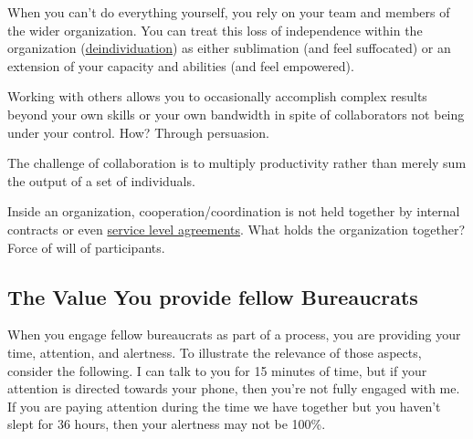 When you can't do everything yourself, you rely on your team and members of the wider organization. You can treat this loss of independence within the organization (\href{https://en.wikipedia.org/wiki/Deindividuation}{deindividuation}) 
as either sublimation (and feel suffocated) or an extension of your capacity and abilities (and feel empowered).



Working with others allows you to occasionally accomplish complex results beyond your own skills or your own bandwidth in spite of collaborators not being under your control. How? Through persuasion. 

The challenge of collaboration is to multiply productivity rather than merely sum the output of a set of individuals. 

Inside an organization, cooperation/coordination is not held together by internal contracts or even \href{https://en.wikipedia.org/wiki/Service-level_agreement}{service level agreements}. 
What holds the organization together? Force of will of participants. 


\subsection*{The Value You provide fellow Bureaucrats}
When you engage fellow bureaucrats as part of a process, you are providing your time, attention, and alertness. To illustrate the relevance of those aspects, consider the following. I can talk to you for 15 minutes of time, but if your attention is directed towards your phone, then you're not fully engaged with me. If you are paying attention during the time we have together but you haven't slept for 36 hours, then your alertness may not be 100\%. 


